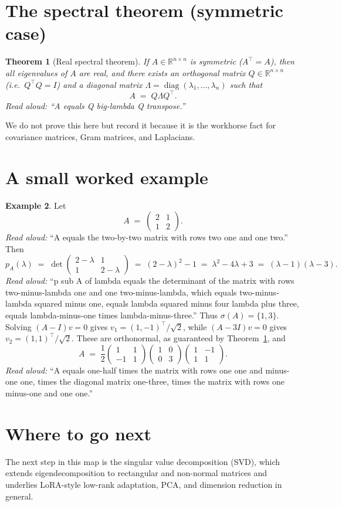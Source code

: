 \documentclass[11pt]{article}
\newtheorem{theorem}{Theorem}
\theoremstyle{definition}
\newtheorem{example}[theorem]{Example}
\theoremstyle{remark}
\newcommand{\R}{\mathbb{R}}
\DeclareMathOperator{\diag}{diag}
\begin{document}
\section{The spectral theorem (symmetric case)}

\begin{theorem}[Real spectral theorem]
\label{thm:spectral}
If $A \in \R^{n\times n}$ is symmetric ($A^{\top} = A$), then all
eigenvalues of $A$ are real, and there exists an orthogonal matrix
$Q \in \R^{n\times n}$ (i.e.\ $Q^{\top} Q = I$) and a diagonal matrix
$\Lambda = \diag(\lambda_1, \dots, \lambda_n)$ such that
\[
  A \;=\; Q \Lambda Q^{\top}.
\]
\emph{Read aloud:} ``A equals Q big-lambda Q transpose.''
\end{theorem}

\noindent We do not prove this here but record it because it is the
workhorse fact for covariance matrices, Gram matrices, and Laplacians.

\section{A small worked example}

\begin{example}
Let
\[
  A \;=\; \begin{pmatrix} 2 & 1 \\ 1 & 2 \end{pmatrix}.
\]
\emph{Read aloud:} ``A equals the two-by-two matrix with rows two one and one two.''
Then
\[
  p_A(\lambda) \;=\; \det \begin{pmatrix} 2-\lambda & 1 \\ 1 & 2-\lambda \end{pmatrix}
  \;=\; (2-\lambda)^{2} - 1 \;=\; \lambda^{2} - 4\lambda + 3
  \;=\; (\lambda-1)(\lambda-3).
\]
\emph{Read aloud:} ``p sub A of lambda equals the determinant of the matrix with rows two-minus-lambda one and one two-minus-lambda, which equals two-minus-lambda squared minus one, equals lambda squared minus four lambda plus three, equals lambda-minus-one times lambda-minus-three.''
Thus $\sigma(A) = \{1, 3\}$. Solving $(A - I)v = 0$ gives $v_1 = (1, -1)^{\top}/\sqrt{2}$, while $(A - 3I)v = 0$ gives $v_2 = (1, 1)^{\top}/\sqrt{2}$. These are orthonormal, as guaranteed by Theorem~\ref{thm:spectral}, and
\[
  A \;=\; \frac{1}{2} \begin{pmatrix} 1 & 1 \\ -1 & 1 \end{pmatrix}
  \begin{pmatrix} 1 & 0 \\ 0 & 3 \end{pmatrix}
  \begin{pmatrix} 1 & -1 \\ 1 & 1 \end{pmatrix}.
\]
\emph{Read aloud:} ``A equals one-half times the matrix with rows one one and minus-one one, times the diagonal matrix one-three, times the matrix with rows one minus-one and one one.''
\end{example}

\section{Where to go next}

The next step in this map is the singular value decomposition (SVD),
which extends eigendecomposition to rectangular and non-normal matrices
and underlies LoRA-style low-rank adaptation, PCA, and dimension
reduction in general.
\end{document}
